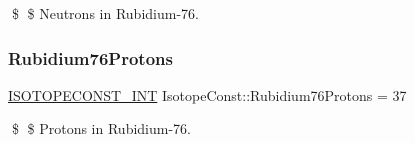 \$ \$ Neutrons in Rubidium-\/76. \mbox{\label{group___isotope_const-_rubidium-_rb76_gaea90e5dec59419e5e6cb39daf8ffac85}} 
\subsubsection{\texorpdfstring{Rubidium76\+Protons}{Rubidium76Protons}}
{\footnotesize\ttfamily \mbox{\hyperlink{group___isotope_const-_macros_ga5f18360b3e99483a35c32d789e62621c}{I\+S\+O\+T\+O\+P\+E\+C\+O\+N\+S\+T\+\_\+\+I\+NT}} Isotope\+Const\+::\+Rubidium76\+Protons = 37}

\$ \$ Protons in Rubidium-\/76. 